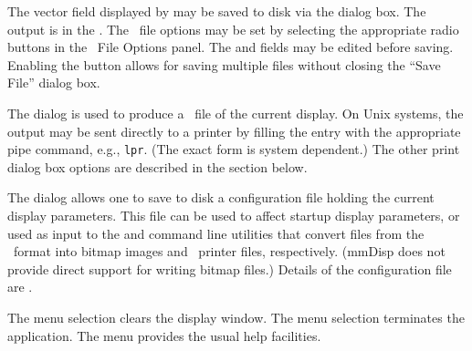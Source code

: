 The vector field displayed by  may be saved to disk via the
{} dialog box.  The output
is in the .  The \OVF\ file
options may be set by selecting the appropriate radio buttons in the
\OVF\ File Options panel.  The  and  fields may be
edited before saving.  Enabling the  button allows for
saving multiple files without closing the ``Save File'' dialog box.

The  dialog is used to
produce a \postscript\ file of the current display.  On Unix systems, the
output may be sent directly to a
printer by filling the
 entry with the appropriate pipe command, e.g.,
\pipe\texttt{lpr}.  (The exact form is system dependent.)  The other
print dialog box options are described in the
 section below.

The  dialog
allows one to save to disk a configuration file holding the current
display parameters.  This file can be used to affect startup display
parameters, or used as input to the  and
 command line utilities
that convert files from the \OVF\ format into bitmap images and
\postscript\ printer files, respectively.  (mmDisp does not provide
direct support for writing bitmap files.)  Details of the configuration
file are .

\label{sec:mmdispcontrols}

The menu selection  clears the display window.
The menu selection  terminates the
 application.  The menu  provides
the usual help facilities.

